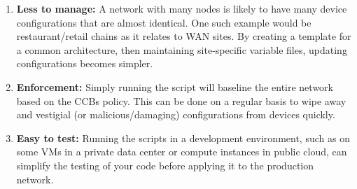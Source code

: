 \begin{enumerate}
  \item \textbf{Less to manage:} A network with many nodes is likely to have many
  device configurations that are almost identical. One such example would be
  restaurant/retail chains as it relates to WAN sites. By creating a template
  for a common architecture, then maintaining site-specific variable files,
  updating configurations becomes simpler.
  \item \textbf{Enforcement:} Simply running the script will baseline the entire
  network based on the CCBs policy. This can be done on a regular basis to wipe
  away and vestigial (or malicious/damaging) configurations from devices quickly.
  \item \textbf{Easy to test:} Running the scripts in a development environment, such
  as on some VMs in a private data center or compute instances in public cloud,
  can simplify the testing of your code before applying it to the production network.
\end{enumerate}

